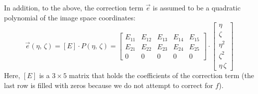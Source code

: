 \documentclass[10pt,a4paper]{article}
\begin{document}
In addition, to the above, the correction term $\vec{e}$ is assumed to be a quadratic polynomial of the image space coordinates:
%
\begin{equation}
\vec{e}(\eta,\,\zeta) = [E]\cdot P(\eta,\,\zeta) =
\begin{bmatrix}
E_{11} & E_{12} & E_{13} & E_{14} & E_{15}\\
E_{21} & E_{22} & E_{23} & E_{24} & E_{25}\\
0 & 0 & 0 & 0 & 0
\end{bmatrix}
\cdot 
\begin{bmatrix}
\eta\\
\zeta\\
\eta^2\\
\zeta^2\\
\eta\,\zeta
\end{bmatrix}
\end{equation}
%
Here, $[E]$ is a $3\times5$ matrix that holds the coefficients of the correction term (the last row is filled with zeros because we do not attempt to correct for $f$).
\end{document}

